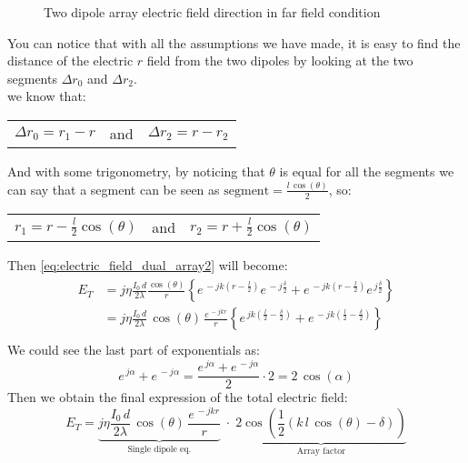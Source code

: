 \begin{figure}[H]
\begin{center}
\begin{tikzpicture}[scale=5,tdplot_main_coords]
            
        \end{tikzpicture}
    \end{center} \caption{Two dipole array electric field direction in far field condition}\label{fig:Two_dipole_array_example_far_field} 
\end{figure}
You can notice that with all the assumptions we have made, it is easy to find the distance of the electric $r$ field from the two dipoles by looking at the two segments $\Delta r_0$ and $\Delta r_2$.\\
we know that:
\begin{center}
    \begin{tabular}{ c c c }
        $\Delta r_0=r_1-r$&
        and&
        $\Delta r_2=r-r_2$
    \end{tabular}
\end{center}
And with some trigonometry, by noticing that $\theta$ is equal for all the segments we can say that a segment can be seen as $\text{segment}=\frac{l\,\cos(\theta)}{2}$, so:
\begin{center}
    \begin{tabular}{ c c c }
        $r_1=r-\frac{l}{2}\cos(\theta)$&
        and&
        $r_2=r+\frac{l}{2}\cos(\theta)$
    \end{tabular}
\end{center}
Then \cref{eq:electric_field_dual_array2} will become:
\begin{align}
    \begin{split}
        E_T&=j\eta\frac{I_0\,d}{2\lambda}\frac{\cos(\theta)}{r}\left\{e^{\,-jk(r-\frac{l}{2})}e^{\,-j\frac{\delta}{2}}+e^{\,-jk(r-\frac{l}{2})}e^{\,j\frac{\delta}{2}}\right\}\\[5pt]
        &=j\eta\frac{I_0\,d}{2\lambda}\,\cos(\theta)\,\frac{e^{\,-jkr}}{r}\left\{e^{\,jk(\frac{l}{2}-\frac{\delta}{2})}+e^{\,-jk(\frac{l}{2}-\frac{\delta}{2})}\right\}\\[5pt]
    \end{split}
\end{align}
We could see the last part of exponentials as:
\begin{equation}
    e^{\,j\alpha}+e^{\,-j\alpha}=\frac{e^{\,j\alpha}+e^{\,-j\alpha}}{2}\cdot 2=2\,\cos(\alpha)    
\end{equation}
Then we obtain the final expression of the total electric field:
\begin{equation}\label{eq:electric_field_dual_array3}
    E_T=\underbrace{j\eta\frac{I_0\,d}{2\lambda}\,\cos(\theta)\,\frac{e^{\,-jkr}}{r}}_{\text{Single dipole eq.}}\;\cdot\;\underbrace{2\cos\left(\frac{1}{2}(k\,l\,\cos(\theta)-\delta)\right)}_{\text{Array factor}}
\end{equation}
